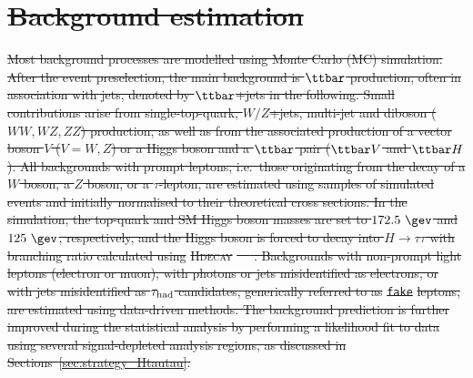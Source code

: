 \documentclass[PAPER, coverpage, atlasdraft=true, texlive=2016, UKenglish]{\ATLASLATEXPATH atlasdoc}
\providecommand{\DIFdel}[1]{{\protect\color{red}\sout{#1}}}                      %
\providecommand{\DIFdelbegin}{} %
\begin{document}
\DIFdelbegin %

\section{\DIFdel{Background estimation}}
\addtocounter{section}{-1}%

\DIFdel{Most background processes are modelled using Monte Carlo (MC) simulation.
After the event preselection, the main background is $\ttbar$ production, often in association with jets, denoted by $\ttbar$+jets in the following.
Small contributions arise from single-top-quark, $W/Z$+jets, multi-jet and diboson ($WW,WZ,ZZ$) production, as well as from the associated 
production of a vector boson $V$ ($V=W,Z$) or a Higgs boson and a $\ttbar$ pair ($\ttbar V$ and $\ttbar H$). All backgrounds 
with prompt leptons, i.e.\ those originating from the decay of a $W$ boson, a $Z$ boson, or a $\tau$-lepton,
are estimated using samples of simulated events and initially normalised to their theoretical cross sections.
In the simulation, the top-quark and SM Higgs boson masses are set to $172.5~\gev$ and $125~\gev$, respectively,
and the Higgs boson is forced to decay into $H\to \tau\tau$ with branching ratio calculated using }\textsc{\DIFdel{Hdecay}}%
\DIFdel{~\mbox{%
\cite{Djouadi:1997yw}}\hspace{0pt}%
.  
Backgrounds with non-prompt light leptons (electron or muon), with photons or jets misidentified as electrons, or with jets misidentified as $\tau_{\mathrm{had}}$ candidates, 
generically referred to as }\texttt{\DIFdel{fake}} %
\DIFdel{leptons, are estimated using data-driven methods. 
The background prediction is further improved during the statistical analysis by performing a likelihood 
fit to data using several signal-depleted analysis regions, as discussed in Sections~\ref{sec:strategy_Htautau}.
}%

\end{document}
